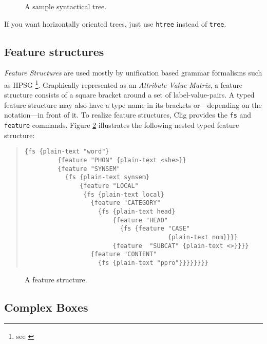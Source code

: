 \begin{figure}[h]
\begin{center}
\leavevmode
{}
\caption{A sample syntactical tree.}
\label{postman}
\end{center}
\end{figure}

If you want horizontally oriented trees, just use {\tt htree} instead
of {\tt tree}.



\subsection{Feature structures}

{\em Feature Structures\/} are used mostly by unification based grammar
formalisms such as HPSG \footnote{see \cite{Pollard 87}}. Graphically
represented as an {\it Attribute Value Matrix}, a feature structure
consists of a square bracket around a set of label-value-pairs. A typed
feature structure may also have a type name in its brackets
or---depending on the notation---in front of it. To realize feature
structures, {\sc Clig} provides the {\tt fs} and {\tt feature}
commands. Figure \ref{fs1} illustrates the following nested typed
feature structure:

\begin{quote}
\begin{verbatim}
{fs {plain-text "word"}
         {feature "PHON" {plain-text <she>}}
         {feature "SYNSEM" 
           {fs {plain-text synsem}
               {feature "LOCAL"
                {fs {plain-text local}
                  {feature "CATEGORY" 
                    {fs {plain-text head}
                        {feature "HEAD" 
                          {fs {feature "CASE" 
                                       {plain-text nom}}}}
                        {feature  "SUBCAT" {plain-text <>}}}}
                  {feature "CONTENT" 
                    {fs {plain-text "ppro"}}}}}}}}
\end{verbatim}
\end{quote} 

\begin{figure}[H]
\begin{center}
\leavevmode
{}
\caption{A feature structure.}
\label{fs1}
\end{center}
\end{figure}

\subsection{Complex Boxes}

